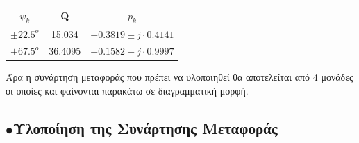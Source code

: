 \documentclass{article}
\begin{document}
{\begin{center}
 \begin{tabular}{|c|c|c|}
        \hline
       \qquad $ψ_k$ \qquad \qquad &\qquad \qquad Q \qquad \qquad \qquad & \qquad \qquad $p_k$ \qquad \qquad \qquad \\
        \hline
        $\pm22.5^o$ & 15.034 & $-0.3819 \pm j\cdot0.4141$ \\
        \hline
        $\pm67.5^o$ & 36.4095 & $-0.1582 \pm j\cdot0.9997$\\
        \hline
        
        \end{tabular}
\end{center}
Άρα η συνάρτηση μεταφοράς που πρέπει να υλοποιηθεί θα αποτελείται από 4 μονάδες οι οποίες και φαίνονται παρακάτω σε διαγραμματική μορφή.
\footnotesize{}
 
\begin{center}
 \begin{changemargin}{-2.2cm}{0.5cm} 
\raisebox{-6ex}{$\to$}%
%
\raisebox{-6ex}{$\to$}%
%
\raisebox{-6ex}{$\to$}%
%
\raisebox{-6ex}{$\to$}%
%
\raisebox{-6ex}{$\to$}%
 \end{changemargin}
\end{center}
\newpage
\large{}
\subsection*{$\bullet$Υλοποίηση της Συνάρτησης Μεταφοράς}
 
}
\end{document}

